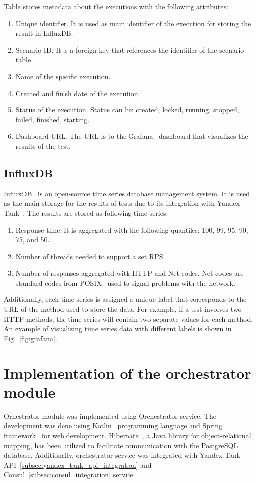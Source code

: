 Table  stores metadata about the executions with the following attributes:
\begin{enumerate}
    \item Unique identifier. It is used as main identifier of the execution for storing the result in InfluxDB.
    \item Scenario ID. It is a foreign key that references the identifier of the scenario table.
    \item Name of the specific execution.
    \item Created and finish date of the execution.
    \item Status of the execution. Status can be: created, locked, running,  stopped,  failed, finished, starting.
    \item Dashboard URL. The URL is to the Grafana~\cite{grafana} dashboard that visualizes the results of the test.
\end{enumerate}

\subsection{InfluxDB}\label{subsec:influxdb}
InfluxDB~\cite{influxdb} is an open-source time series database management system.
It is used as the main storage for the results of tests due to its integration with Yandex Tank~\cite{yandex_tank}. The results are stored as following time series:
\begin{enumerate}
    \item Response time. It is aggregated with the following quantiles: 100, 99, 95, 90, 75, and 50.
    \item Number of threads needed to support a set RPS.
    \item Number of responses aggregated with HTTP and Net codes. Net codes are standard codes from POSIX~\cite{posix_errors} used to signal problems with the network.
\end{enumerate}
Additionally, each time series is assigned a unique label that corresponds to the URL of the method used to store the data. For example, if a test involves two HTTP methods, the time series will contain two separate values for each method.
An example of visualizing time series data with different labels is shown in Fig.~\ref{fig:grafana}.


\section{Implementation of the orchestrator module}\label{sec:ochestrator_impl}
Orhestrator module was implemented using Orchestrator service. The development was done using Kotlin~\cite{kotlin} programming language and Spring framework~\cite{spring} for web development.
Hibernate~\cite{hibernate}, a Java library for object-relational mapping, has been utilized to facilitate communication with the PostgreSQL database.
Additionally, orchestrator service was integrated with Yandex Tank API~\ref{subsec:yandex_tank_api_integration} and Consul~\ref{subsec:consul_integration} service.

